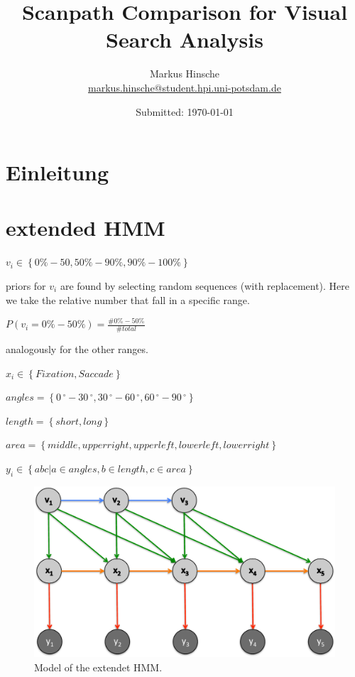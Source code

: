 \documentclass[
        a4paper,     %
        titlepage,   %
        twoside,     %
        parskip      %
        ]{scrartcl} %
\title{Scanpath Comparison for Visual Search Analysis}
\author{Markus Hinsche\\{\small{\url{markus.hinsche@student.hpi.uni-potsdam.de}}}}
\date{Submitted: \today}
\begin{document}
  \maketitle    %


  \cleardoublepage %



  \section{Einleitung}



    \section{extended HMM}



$
v_i \in \left\{ {0\%-50,50\%-90\%,90\%-100\%} \right\}
$

priors for $v_i$ are found by selecting random sequences (with replacement). Here we take the relative number that fall in a specific range.

$
P(v_i=0\%-50\%) = \frac{\#0\%-50\%}{\#total}
$

analogously for the other ranges. 


$
x_i \in \left\{ { Fixation,Saccade} \right\}
$

$
angles = \left\{ {0\,^{\circ}-30\,^{\circ}, 30\,^{\circ}-60\,^{\circ}, 60\,^{\circ}-90\,^{\circ}} \right\}
$

$
length = \left\{ {short, long} \right\}
$

$
area = \left\{ {middle, upper right, upper left, lower left, lower right} \right\}
$


$
y_i \in \left\{ { abc | a\in angles, b\in length, c\in area} \right\}
$

\begin{figure}[h]
    \centering
    \includegraphics[width=0.6\columnwidth]{graphics/extendedHMM.pdf}
    \caption{\label{fig:extendedHMM} Model of the extendet HMM. }
\end{figure}
\end{document}
